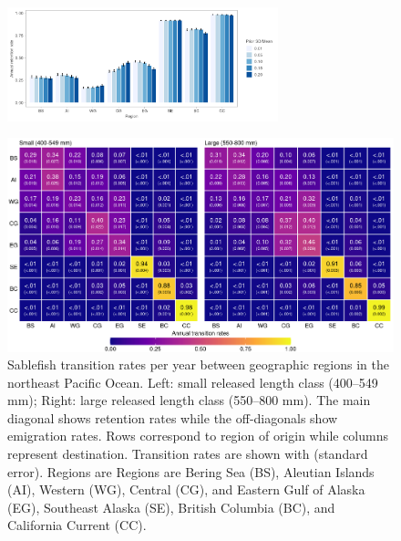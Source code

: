 \documentclass{article}
\begin{document}
\begin{figure}[htb]
    \centering
    \includegraphics[width = 0.7\textwidth]{bar-sensitivity-harvest-priors.png}
    \caption{}
    \label{fig:bar-sensitivity-harvest-priors}
\end{figure}

\begin{figure}[htb]
    \centering
    \includegraphics[width = \textwidth]{heat-region-average-length}
    \caption{Sablefish transition rates per year between geographic regions in the northeast Pacific Ocean. Left: small released length class (400--549 mm); Right: large released length class (550--800 mm). The main diagonal shows retention rates while the off-diagonals show emigration rates. Rows correspond to region of origin while columns represent destination. Transition rates are shown with (standard error). Regions are Regions are Bering Sea (BS), Aleutian Islands (AI), Western (WG), Central (CG), and Eastern Gulf of Alaska (EG), Southeast Alaska (SE), British Columbia (BC), and California Current (CC).}
    \label{fig:heat-region-average-length}
\end{figure}
\end{document}
